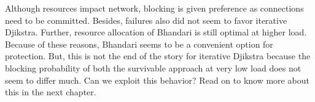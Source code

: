 Although resources impact network, blocking is given preference as connections need to be committed. Besides, failures also did not seem to favor iterative Djikstra. Further, resource allocation of Bhandari is still optimal at higher load. Because of these reasons, Bhandari seems to be a convenient option for protection. But, this is not the end of the story for iterative Djikstra because the blocking probability of both the survivable approach at very low load does not seem to differ much. Can we exploit this behavior? Read on to know more about this in the next chapter.












